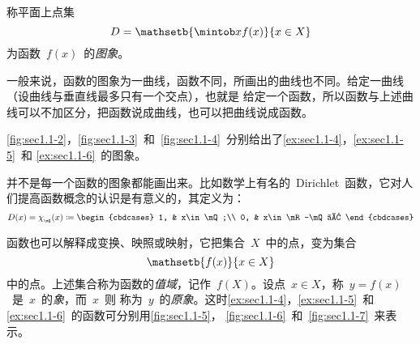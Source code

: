 \begin{definition}
称平面上点集
\[
  D=\mathsetb{\mintob x{f(x)}}{x\in X}
\]
为函数~$f(x)$~的\emph{图象}。
\end{definition}

一般来说，函数的图象为一曲线，函数不同，所画出的曲线也不同。给定一曲线（设曲线与垂直线最多只有一个交点），也就是
给定一个函数，所以函数与上述曲线可以不加区分，把函数说成曲线，也可以把曲线说成函数。

\ref{fig:sec1.1-2}，\ref{fig:sec1.1-3}~和~\ref{fig:sec1.1-4}~分别给出了\ref{ex:sec1.1-4}，\ref{ex:sec1.1-5}~和%
\ref{ex:sec1.1-6}~的图象。

\begin{figure}
\begin{floatrow}[3]
\figurebox{\caption{}\label{fig:sec1.1-2}}
          {\somefigure}
\figurebox{\caption{}\label{fig:sec1.1-3}}
          {\somefigure}
\figurebox{\caption{}\label{fig:sec1.1-4}}
          {\somefigure}
\end{floatrow}
\end{figure}

并不是每一个函数的图象都能画出来。比如数学上有名的~Dirichlet~函数，它对人们提高函数概念的认识是有意义的，其定义为：
\[
  D(x)=\chi_{_{\mQ}}(x)\coloneq\begin{cbdcases}
  1, & x\in\mQ;\\
  0, & x\in\mR-\mQ 。
  \end{cbdcases}
\]

函数也可以解释成变换、映照或映射，它把集合~$X$~中的点，变为集合
\[
  \mathsetb{f(x)}{x\in X}
\]
中的点。上述集合称为函数的\emph{值域}，记作~$f(X)$。设点~$x\in X$，称~$y=f(x)$~是~$x$~的\emph{象}，而~$x$~则
称为~$y$~的\emph{原象}。这时\ref{ex:sec1.1-4}，\ref{ex:sec1.1-5}~和\ref{ex:sec1.1-6}~的函数可分别用\ref{fig:sec1.1-5}，%
\ref{fig:sec1.1-6}~和~\ref{fig:sec1.1-7}~来表示。

\begin{figure}
\begin{floatrow}[3]
\figurebox{\caption{}\label{fig:sec1.1-5}}
          {\somefigure}
\figurebox{\caption{}\label{fig:sec1.1-6}}
          {\somefigure}
\figurebox{\caption{}\label{fig:sec1.1-7}}
          {\somefigure}
\end{floatrow}
\end{figure}

